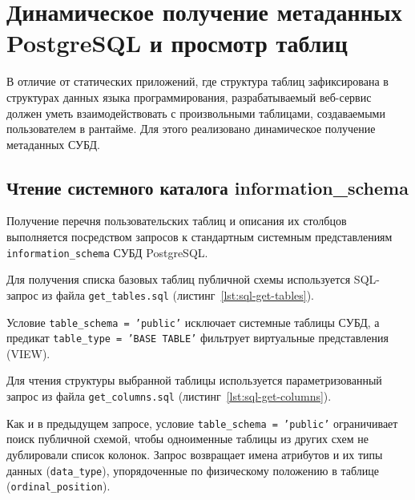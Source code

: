 \section{Динамическое получение метаданных PostgreSQL и просмотр таблиц}
\label{sec:introspection}

В отличие от статических приложений, где структура таблиц зафиксирована в структурах данных языка программирования, разрабатываемый веб-сервис должен уметь взаимодействовать с произвольными таблицами, создаваемыми пользователем в рантайме. Для этого реализовано динамическое получение метаданных СУБД.

\subsection{Чтение системного каталога information\_schema}

Получение перечня пользовательских таблиц и описания их столбцов выполняется посредством запросов к стандартным системным представлениям \texttt{information\_schema} СУБД PostgreSQL.

Для получения списка базовых таблиц публичной схемы используется SQL-запрос из файла \texttt{get\_tables.sql} (листинг~\ref{lst:sql-get-tables}).

\begin{listing}[H]
    \caption{Запрос списка пользовательских таблиц из \texttt{information\_schema.tables}}
    \label{lst:sql-get-tables}
\end{listing}

Условие \texttt{table\_schema = 'public'} исключает системные таблицы СУБД, а предикат \texttt{table\_type = 'BASE TABLE'} фильтрует виртуальные представления (VIEW).

Для чтения структуры выбранной таблицы используется параметризованный запрос из файла \texttt{get\_columns.sql} (листинг~\ref{lst:sql-get-columns}).

\begin{listing}[H]
    \caption{Запрос описания колонок таблицы из \texttt{information\_schema.columns}}
    \label{lst:sql-get-columns}
\end{listing}

Как и в предыдущем запросе, условие \texttt{table\_schema = 'public'} ограничивает поиск публичной схемой, чтобы одноименные таблицы из других схем не дублировали список колонок. Запрос возвращает имена атрибутов и их типы данных (\texttt{data\_type}), упорядоченные по физическому положению в таблице (\texttt{ordinal\_position}).

